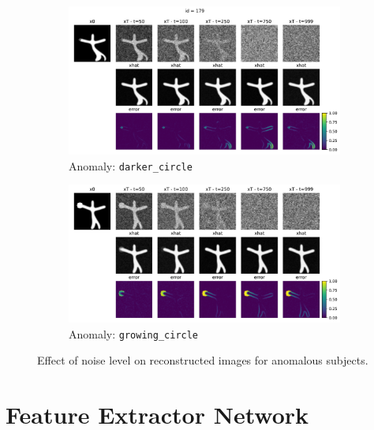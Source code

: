 \begin{figure}[htbp]
  \centering
  \begin{subfigure}{0.75\linewidth}
    \includegraphics[width=\linewidth]{figures/effect_noise_darker_circle.pdf}
    \caption{Anomaly: \texttt{darker\_circle}}
  \end{subfigure}

  \begin{subfigure}{0.75\linewidth}
    \includegraphics[width=\linewidth]{figures/effect_noise_growing_circle.pdf}
    \caption{Anomaly: \texttt{growing\_circle}}
  \end{subfigure}

  \caption{Effect of noise level on reconstructed images for anomalous subjects.}
  \label{fig:effect-noise-example-ano}
\end{figure}

\chapter{Feature Extractor Network}
\label{app:fe-layer}

